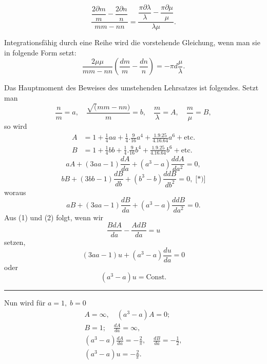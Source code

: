 \begingroup
\makeatletter\tagsleft@true\let\veqno\@@leqno\makeatother
\clearpage{}
\begin{equation*}\tag*{[2]}
\frac{\dfrac{2\partial m}m-\dfrac{2\partial n}n}{mm-nn}
=\frac{\dfrac{\pi\partial\lambda}\lambda-\dfrac{\pi\partial\mu}\mu}{\lambda\mu}.
\end{equation*}
\par\indent Integrationsfähig durch eine Reihe wird die vorstehende Gleichung, wenn man sie in folgende Form setzt:
\[\frac{2\mu\mu}{mm-nn}\left(\frac{dm}m-\frac{dn}n\right)=-\pi d\frac\mu\lambda.\]
\par\indent Das Hauptmoment des Beweises des umstehenden Lehrsatzes ist folgendes. Setzt man
\[\frac nm=a,\quad\frac{\surd(mm-nn)}m=b,\quad\frac m\lambda=A,\quad\frac m\mu=B,\]
\noindent so wird
\[\begin{aligned}
A&=1+\frac14aa+\frac14.\frac9{16}a^4+\frac{1.9.25}{4.16.64}a^6+\text{etc.}\\[.5em]
B&=1+\frac14bb+\frac14.\frac9{16}b^4+\frac{1.9.25}{4.16.64}b^6+\text{etc.}
\end{aligned}\]
\begin{equation*}\tag*{(1)}
aA+(3aa-1)\frac{dA}{da}+(a^3-a)\frac{ddA}{da^2}=0,
\end{equation*}
\[bB+(3bb-1)\frac{dB}{db}+(b^3-b)\frac{ddB}{db^2}=0,\;\text{[*)]}\]
\noindent woraus
\begin{equation*}\tag*{(2)}
aB+(3aa-1)\frac{dB}{da}+(a^3-a)\frac{ddB}{da^2}=0.
\end{equation*}
\noindent Aus (1) und (2) folgt, wenn wir
\[\frac{BdA}{da}-\frac{AdB}{da}=u\]
\noindent setzen,
\[(3aa-1)u+(a^3-a)\frac{du}{da}=0\]
\noindent oder
\[(a^3-a)u=\text{Const.}\]
\par\medskip\noindent\rule{.25\linewidth}{.4pt}
\par\smallskip{}
\clearpage{}
\par\indent Nun wird für \(a=1,\;b=0\)
\[\begin{gathered}
A=\infty,\quad(a^3-a)A=0;\\[.4em]
B=1;\quad\frac{dA}{da}=\infty,\\[.5em]
(a^3-a)\frac{dA}{da}=-\frac2\pi,\quad\frac{dB}{da}=-\frac12,\\[.5em]
(a^3-a)u=-\frac2\pi.
\end{gathered}\]
